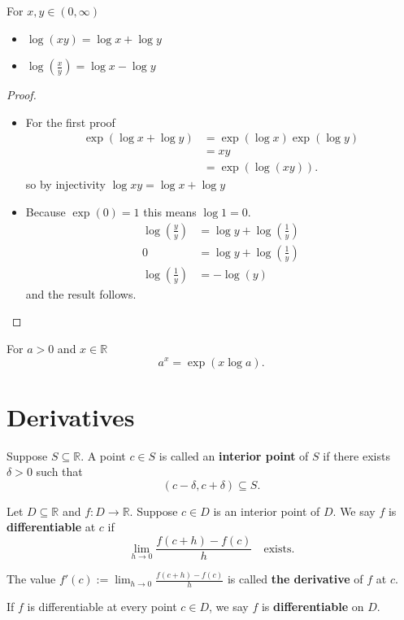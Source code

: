 \begin{prop}
    For $x, y \in (0, \infty)$
    \begin{itemize}
      \item $\log(xy) = \log x + \log y$
      \item $\log( \frac{x}{y}) = \log x - \log y$
    \end{itemize}
\end{prop}
\begin{proof} $ $
  \begin{itemize}
    \item For the first proof
      \begin{align*}
        \exp(\log x + \log y) &= \exp(\log x)\exp(\log y) \\
                               &= xy \\
                               &= \exp(\log(x y))
    .\end{align*}
    so by injectivity $\log xy = \log x + \log y$
  \item Because $\exp(0) = 1$ this means $\log 1 = 0$.
    \begin{align*}
      \log( \frac{y}{y}) &= \log y + \log( \frac{1}{y}) \\
                      0  &= \log y + \log( \frac{1}{y})\\
                      \log( \frac{1}{y}) &= -\log(y)
    \end{align*}
    and the result follows.
  \end{itemize}
\end{proof}

\begin{definition}
  For $a > 0$ and $x \in \mathbb{R}$
  \[a^x = \exp(x \log a).\]
\end{definition}

\section{Derivatives}

\begin{definition}
Suppose $S \subseteq \mathbb{R}$. A point $c \in S$ is called an {\bf interior point} of $S$ if there exists $\delta > 0$ such that
\[(c - \delta, c + \delta) \subseteq S.\]
\end{definition}

\begin{definition}
  Let $D \subseteq \mathbb{R}$ and $f: D \rightarrow \mathbb{R}$. Suppose $c \in D$ is an interior point of $D$. We say $f$ is {\bf differentiable} at $c$ if
  \[\lim_{h \rightarrow 0} \frac{f(c + h) - f(c)}{h} \quad \text{exists}.\]

  The value $f'(c) := \lim_{h \rightarrow 0} \frac{f(c + h) - f(c)}{h}$ is called {\bf the derivative} of $f$ at $c$.

  If $f$ is differentiable at every point $c \in D$, we say $f$ is {\bf differentiable} on $D$.
\end{definition}

